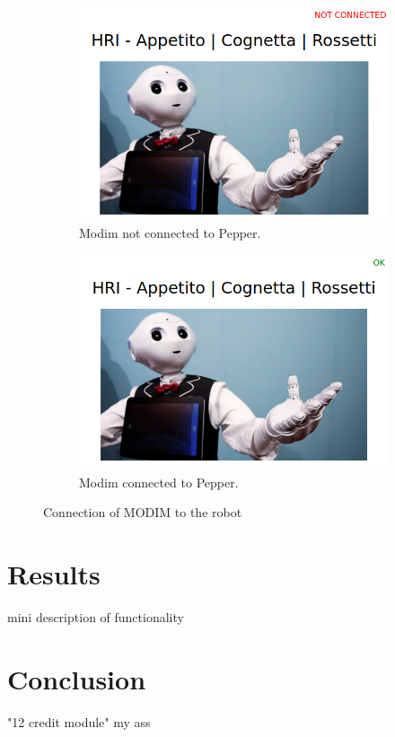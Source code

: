 \documentclass[12pt, letterpaper, twoside]{article}
\begin{document}
\begin{figure}[h]
	\centering
	\begin{subfigure}{.5\textwidth}
	  \centering
	  \includegraphics[width=1\linewidth]{img/modim_notok.png}
	  \caption{Modim not connected to Pepper.}
	  \label{fig:sub1}
	\end{subfigure}%
	\begin{subfigure}{.5\textwidth}
	  \centering
	  \includegraphics[width=1\linewidth]{img/modim_ok.png}
	  \caption{Modim connected to Pepper.}
	  \label{fig:sub2}
	\end{subfigure}
	\caption{Connection of MODIM to the robot}
	\label{fig:test}
\end{figure}

\newpage

\section{Results}

mini description of functionality

\section{Conclusion}

"12 credit module" my ass
\end{document}
